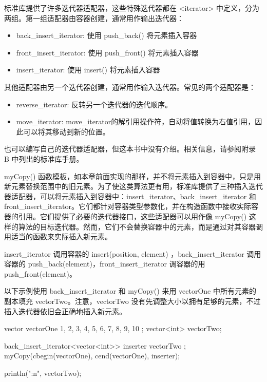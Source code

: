 
标准库提供了许多迭代器适配器，这些特殊迭代器都在 <iterator> 中定义，分为两组。第一组适配器由容器创建，通常用作输出迭代器：

\begin{itemize}
\item
back\_insert\_iterator: 使用 push\_back() 将元素插入容器

\item
front\_insert\_iterator: 使用 push\_front() 将元素插入容器

\item
insert\_iterator: 使用 insert() 将元素插入容器
\end{itemize}

其他适配器由另一个迭代器创建，通常用作输入迭代器。常见的两个适配器是：

\begin{itemize}
\item
reverse\_iterator: 反转另一个迭代器的迭代顺序。

\item
move\_iterator: move\_iterator的解引用操作符，自动将值转换为右值引用，因此可以将其移动到新的位置。
\end{itemize}

也可以编写自己的迭代器适配器，但这本书中没有介绍。相关信息，请参阅附录 B 中列出的标准库手册。


myCopy() 函数模板，如本章前面实现的那样，并不将元素插入到容器中，只是用新元素替换范围中的旧元素。为了使这类算法更有用，标准库提供了三种插入迭代器适配器，可以将元素插入到容器中：insert\_iterator、back\_insert\_iterator 和 front\_insert\_iterator。它们都针对容器类型参数化，并在构造函数中接收实际容器的引用。它们提供了必要的迭代器接口，这些适配器可以用作像 myCopy() 这样的算法的目标迭代器。然而，它们不会替换容器中的元素，而是通过对其容器调用适当的函数来实际插入新元素。

insert\_iterator 调用容器的 insert(position, element) ，back\_insert\_iterator 调用容器的 push\_back(element)，front\_insert\_iterator 调容器的用 push\_front(element)。

以下示例使用 back\_insert\_iterator 和 myCopy() 来用 vectorOne 中所有元素的副本填充 vectorTwo。注意，vectorTwo 没有先调整大小以拥有足够的元素，不过插入迭代器依旧会正确地插入新元素。

\begin{cpp}
vector vectorOne { 1, 2, 3, 4, 5, 6, 7, 8, 9, 10 };
vector<int> vectorTwo;

back_insert_iterator<vector<int>> inserter { vectorTwo };
myCopy(cbegin(vectorOne), cend(vectorOne), inserter);

println("{:n}", vectorTwo);
\end{cpp}

